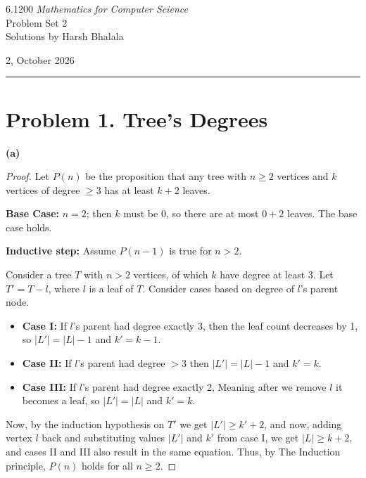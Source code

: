 \documentclass{article}
\begin{document}
\noindent
\begin{minipage}[t]{0.68\textwidth}
{\large 6.1200 \textit{Mathematics for Computer Science}}\\[4pt]
{\large Problem Set 2}\\[4pt]
{\large Solutions by Harsh Bhalala}
\end{minipage}%
\hfill
\begin{minipage}[t]{0.27\textwidth}
\raggedleft
{\large 2, October 2026}
\end{minipage}

\vspace{6pt}

\noindent\rule{\textwidth}{0.5pt}

\section*{Problem 1. Tree's Degrees}
\textbf{(a)}
\begin{proof}
Let $P(n)$ be the proposition that any tree with $n \ge 2$ vertices and $k$ vertices of degree $\ge 3$ has at least $k + 2$ leaves.

\textbf{Base Case:} $n = 2$; then $k$ must be 0, so there are at most $0 + 2$ leaves. The base case holds.

\textbf{Inductive step:} Assume $P(n-1)$ is true for $n > 2$.

Consider a tree $T$ with $n > 2$ vertices, of which $k$ have degree at least 3. Let $T' = T - l$, where $l$ is a leaf of $T$. Consider cases based on degree of $l$'s parent node.
\begin{itemize}
\item \textbf{Case I:} If $l$'s parent had degree exactly 3, then the leaf count decreases by 1, so $|L'| = |L| - 1$ and $k' = k - 1$.
\item \textbf{Case II:} If $l$'s parent had degree $> 3$ then $|L'| = |L| - 1$ and $k' = k$.
\item \textbf{Case III:} If $l$'s parent had degree exactly 2, Meaning after we remove $l$ it becomes a leaf, so $|L'| = |L|$ and $k' = k$.

\end{itemize}
Now, by the induction hypothesis on $T'$ we get $|L'| \geq k' + 2$, and now, adding vertex $l$ back and substituting
values $|L'|$ and $k'$ from case I, we get $|L| \geq k + 2$, and cases II and III also result in the same equation.
Thus, by The Induction principle, $P(n)$ holds for all $n \geq 2$.

\end{proof}
\end{document}
